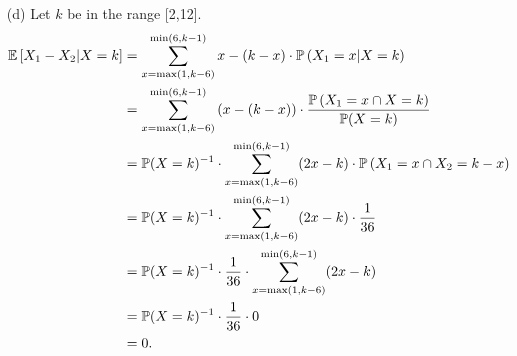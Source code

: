 \begin{enumerate}
  \item[(d)] Let $k$ be in the range [2,12].
    \begin{align*}
      \mathbb{E}\left[ X_1 - X_2 | X = k \right]
        &= \sum_{x = \max(1, k-6)}^{\min(6, k-1)} x - (k - x) \cdot \mathbb{P}\left( X_1 = x | X = k \right) \\
        &= \sum_{x = \max(1, k-6)}^{\min(6, k-1)} \left(x - (k - x)\right) \cdot \frac{\mathbb{P}\left( X_1 = x \cap X = k \right)}{\mathbb{P}(X = k)} \\
        &= \mathbb{P}(X = k)^{-1} \cdot \sum_{x = \max(1, k-6)}^{\min(6, k-1)} (2x - k) \cdot \mathbb{P}\left( X_1 = x \cap X_2 = k - x \right) \\
        &= \mathbb{P}(X = k)^{-1} \cdot \sum_{x = \max(1, k-6)}^{\min(6, k-1)} (2x - k) \cdot \frac{1}{36} \\
        &= \mathbb{P}(X = k)^{-1} \cdot \frac{1}{36} \cdot \sum_{x = \max(1, k-6)}^{\min(6, k-1)} (2x - k)  \\
        &= \mathbb{P}(X = k)^{-1} \cdot \frac{1}{36} \cdot 0 \\
        &= 0.
    \end{align*}
\end{enumerate}
